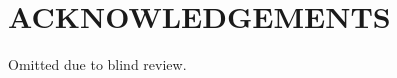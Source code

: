 \documentclass[a4paper,twoside]{style/article}
\begin{document}
\section*{\uppercase{Acknowledgements}}
\noindent Omitted due to blind review.


\vfill

{\small
}




\vfill
\end{document}
